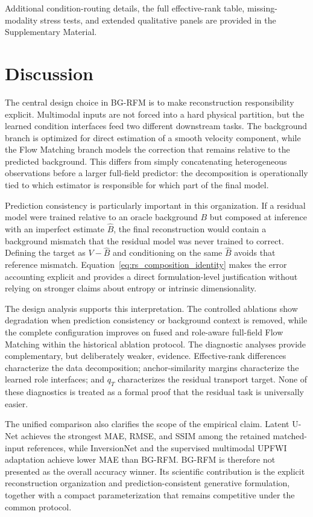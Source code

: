 \documentclass[remotesensing,article,submit,pdftex,moreauthors]{Definitions/mdpi}
\newcommand{\method}{BG-RFM}
\begin{document}
Additional condition-routing details, the full effective-rank table, missing-modality stress tests, and extended qualitative panels are provided in the Supplementary Material.

\section{Discussion}

The central design choice in \method{} is to make reconstruction responsibility explicit. Multimodal inputs are not forced into a hard physical partition, but the learned condition interfaces feed two different downstream tasks. The background branch is optimized for direct estimation of a smooth velocity component, while the Flow Matching branch models the correction that remains relative to the predicted background. This differs from simply concatenating heterogeneous observations before a larger full-field predictor: the decomposition is operationally tied to which estimator is responsible for which part of the final model.

Prediction consistency is particularly important in this organization. If a residual model were trained relative to an oracle background $B$ but composed at inference with an imperfect estimate $\hat B$, the final reconstruction would contain a background mismatch that the residual model was never trained to correct. Defining the target as $V-\hat B$ and conditioning on the same $\hat B$ avoids that reference mismatch. Equation~\eqref{eq:rs_composition_identity} makes the error accounting explicit and provides a direct formulation-level justification without relying on stronger claims about entropy or intrinsic dimensionality.

The design analysis supports this interpretation. The controlled ablations show degradation when prediction consistency or background context is removed, while the complete configuration improves on fused and role-aware full-field Flow Matching within the historical ablation protocol. The diagnostic analyses provide complementary, but deliberately weaker, evidence. Effective-rank differences characterize the data decomposition; anchor-similarity margins characterize the learned role interfaces; and $q_T$ characterizes the residual transport target. None of these diagnostics is treated as a formal proof that the residual task is universally easier.

The unified comparison also clarifies the scope of the empirical claim. Latent U-Net achieves the strongest MAE, RMSE, and SSIM among the retained matched-input references, while InversionNet and the supervised multimodal UPFWI adaptation achieve lower MAE than BG-RFM. BG-RFM is therefore not presented as the overall accuracy winner. Its scientific contribution is the explicit reconstruction organization and prediction-consistent generative formulation, together with a compact parameterization that remains competitive under the common protocol.
\end{document}
